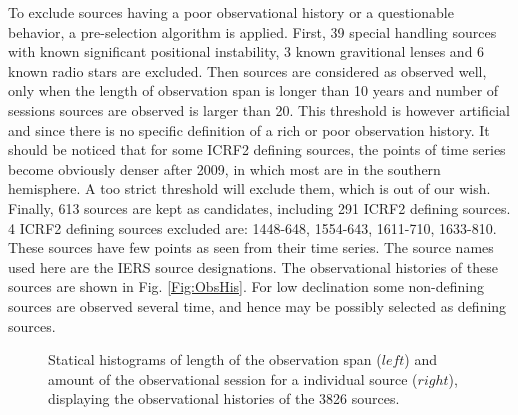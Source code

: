 \documentclass{aa}
\begin{document}
To exclude sources having a poor observational history or a questionable behavior, a pre-selection algorithm is applied. First, 39 special handling sources with known significant positional instability, 3 known gravitional lenses and 6 known radio stars\citep[see][Sect.~4]{2009ITN....35....1M} are excluded. Then sources are considered as observed well, only when the length of observation span is longer than 10 years and number of sessions sources are observed is larger than 20. This threshold is however artificial and since there is no specific definition of a rich or poor observation history.  It should be noticed that for some ICRF2 defining sources, the points of time series become obviously denser after 2009, in which most are in the southern hemisphere. A too strict threshold will exclude them, which is out of our wish. Finally, 613 sources are kept as candidates, including 291 ICRF2 defining sources. 4 ICRF2 defining sources excluded are: 1448-648, 1554-643, 1611-710, 1633-810. These sources have few points as seen from their time series. The source names used here are the IERS source designations. The observational histories of these sources are shown in Fig. \ref{Fig:ObsHis}. For low declination some non-defining sources are observed several time, and hence may be possibly selected as defining sources.
%
\begin{figure*}[htb]
   \centering
      \caption{Statical histograms of length of the observation span ($left$) and amount of the observational session for a individual source ($right$), displaying the observational histories of the 3826 sources. 
              }
         \label{Fig:Observation}
   \end{figure*}
%
   
\end{document}
